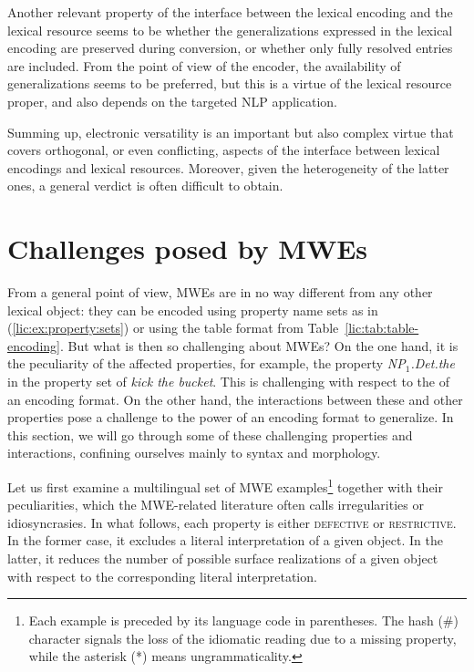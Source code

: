 \documentclass[output=paper
,modfonts
,nonflat
,biblatexbackend=biber
]{langsci/langscibook}
\begin{document}
Another relevant property of the interface between the lexical encoding and the lexical resource seems to be whether the generalizations expressed in the lexical encoding are preserved during conversion, or whether only fully resolved entries are included. From the point of view of the encoder, the availability of generalizations seems to be preferred, but this is a virtue of the lexical resource proper, and also depends on the targeted NLP application.

Summing up, electronic versatility is an important but also complex virtue that covers orthogonal, or even conflicting, aspects of the interface between lexical encodings and lexical resources. Moreover, given the heterogeneity of the latter ones, a general verdict is often difficult to obtain.    


%

\section{Challenges posed by MWEs}
\label{lic:sec:challenges}

From a general point of view, MWEs are in no way different from any other lexical object: they can be encoded using property name sets as in (\ref{lic:ex:property:sets}) or using the table format from Table~\ref{lic:tab:table-encoding}. But what is then so challenging about MWEs? On the one hand, it is the peculiarity of the affected properties, for example, the property \textit{NP$_1$.Det.the} in the property set of \textit{kick the bucket}. This is challenging with respect to the  of an encoding format. On the other hand, the interactions between these and other properties pose a challenge to the power of an encoding format to generalize. In this section, we will go through some of these challenging properties and interactions,  confining ourselves mainly to syntax and morphology.

Let us first examine a multilingual set of MWE examples\footnote{Each example is preceded by its language code in parentheses. The hash (\#) character signals the loss of the idiomatic reading due to a missing property, while the asterisk (*) means ungrammaticality.} together with their peculiarities, which the MWE-related literature often calls irregularities or idiosyncrasies. In what follows, each property is either \textsc{defective} or \textsc{restrictive}. In the former case, it excludes a literal interpretation of a given object. In the latter, it reduces the number of possible surface realizations of a given object with respect to the corresponding literal interpretation. 
\end{document}
